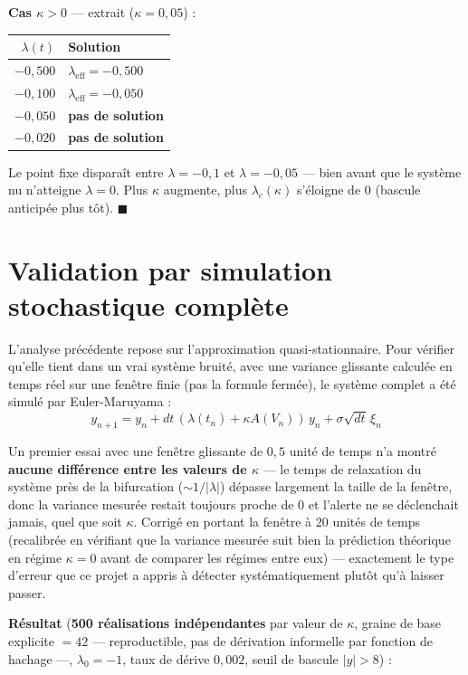 \documentclass[11pt,a4paper]{article}
\newcommand{\qedhere}{\hfill$\blacksquare$\par\smallskip}
\begin{document}
\textbf{Cas $\kappa>0$} — extrait ($\kappa=0{,}05$) :
\begin{center}
\begin{tabular}{@{}rl@{}}
\toprule
$\lambda(t)$ & Solution \\
\midrule
$-0{,}500$ & $\lambda_{\text{eff}}=-0{,}500$ \\
$-0{,}100$ & $\lambda_{\text{eff}}=-0{,}050$ \\
$-0{,}050$ & \textbf{pas de solution} \\
$-0{,}020$ & \textbf{pas de solution} \\
\bottomrule
\end{tabular}
\end{center}
Le point fixe disparaît entre $\lambda=-0{,}1$ et $\lambda=-0{,}05$ —
bien avant que le système nu n'atteigne $\lambda=0$. Plus $\kappa$
augmente, plus $\lambda_c(\kappa)$ s'éloigne de $0$ (bascule anticipée
plus tôt). \qedhere

\section{Validation par simulation stochastique complète}

L'analyse précédente repose sur l'approximation quasi-stationnaire. Pour
vérifier qu'elle tient dans un vrai système bruité, avec une variance
glissante calculée en temps réel sur une fenêtre finie (pas la formule
fermée), le système complet a été simulé par Euler-Maruyama :
$$y_{n+1} = y_n + dt\,(\lambda(t_n) + \kappa A(V_n))\,y_n + \sigma\sqrt{dt}\,\xi_n$$

\begin{remarque}
Un premier essai avec une fenêtre glissante de $0{,}5$ unité de temps
n'a montré \textbf{aucune différence entre les valeurs de $\kappa$} — le
temps de relaxation du système près de la bifurcation ($\sim 1/|\lambda|$)
dépasse largement la taille de la fenêtre, donc la variance mesurée
restait toujours proche de $0$ et l'alerte ne se déclenchait jamais,
quel que soit $\kappa$. Corrigé en portant la fenêtre à $20$ unités de
temps (recalibrée en vérifiant que la variance mesurée suit bien la
prédiction théorique en régime $\kappa=0$ avant de comparer les régimes
entre eux) — exactement le type d'erreur que ce projet a appris à
détecter systématiquement plutôt qu'à laisser passer.
\end{remarque}

\textbf{Résultat} (\textbf{500 réalisations indépendantes} par valeur de
$\kappa$, graine de base explicite $=42$ — reproductible, pas de
dérivation informelle par fonction de hachage —, $\lambda_0=-1$, taux de
dérive $0{,}002$, seuil de bascule $|y|>8$) :
\end{document}
